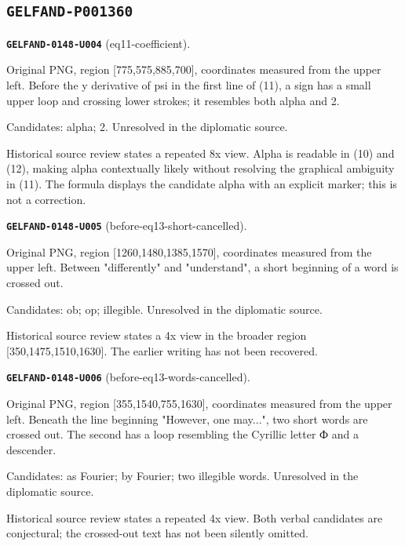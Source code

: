 \documentclass[11pt]{article}
\theoremstyle{definition}
\theoremstyle{remark}
\begin{document}
\subsection*{\texttt{GELFAND-P001360}}
\noindent\leavevmode{}\label{GELFAND-P001360:eq11-coefficient:note}\textbf{\texttt{GELFAND-0148-U004}} (eq11-coefficient).\par\nopagebreak[4]
Original PNG, region [775,575,885,700], coordinates measured from the upper left. Before the y derivative of psi in the first line of (11), a sign has a small upper loop and crossing lower strokes; it resembles both alpha and 2.\par
Candidates: alpha; 2. Unresolved in the diplomatic source.\par
Historical source review states a repeated 8x view. Alpha is readable in (10) and (12), making alpha contextually likely without resolving the graphical ambiguity in (11). The formula displays the candidate alpha with an explicit marker; this is not a correction.\par\medskip
\noindent\leavevmode{}\label{GELFAND-P001360:before-eq13-short-cancelled:note}\textbf{\texttt{GELFAND-0148-U005}} (before-eq13-short-cancelled).\par\nopagebreak[4]
Original PNG, region [1260,1480,1385,1570], coordinates measured from the upper left. Between "differently" and "understand", a short beginning of a word is crossed out.\par
Candidates: ob; op; illegible. Unresolved in the diplomatic source.\par
Historical source review states a 4x view in the broader region [350,1475,1510,1630]. The earlier writing has not been recovered.\par\medskip
\noindent\leavevmode{}\label{GELFAND-P001360:before-eq13-words-cancelled:note}\textbf{\texttt{GELFAND-0148-U006}} (before-eq13-words-cancelled).\par\nopagebreak[4]
Original PNG, region [355,1540,755,1630], coordinates measured from the upper left. Beneath the line beginning "However, one may...", two short words are crossed out. The second has a loop resembling the Cyrillic letter Ф and a descender.\par
Candidates: as Fourier; by Fourier; two illegible words. Unresolved in the diplomatic source.\par
Historical source review states a repeated 4x view. Both verbal candidates are conjectural; the crossed-out text has not been silently omitted.\par\medskip
\end{document}
